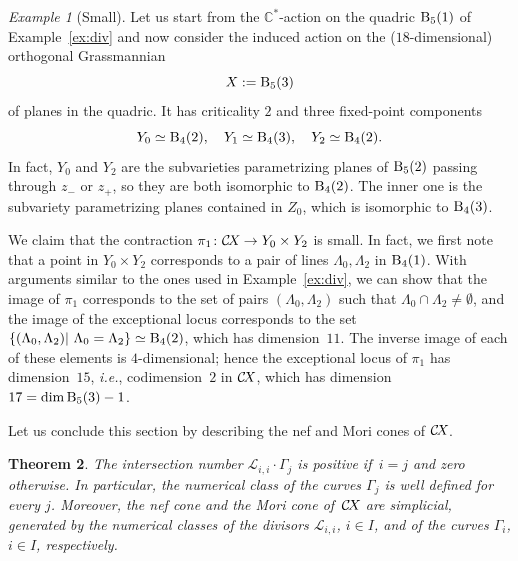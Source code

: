 \documentclass[10pt,a4paper]{article}
\numberwithin{equation}{section}
\newtheorem{theorem}{Theorem}[section]
\theoremstyle{definition}
\theoremstyle{remark}
\newtheorem{example}[theorem]{Example}
\def\C{{\mathbb C}}
\def\cL{{\mathcal L}}
\def\DB{{\rm B}}
\def\CX{\mathcal{C}\!X\hspace{-0.5pt}}
\begin{document}
\begin{example}[Small]\label{ex:sm}  Let us start from the $\C^*$-action on the quadric $\DB_5(1)$ of Example~\ref{ex:div} and now consider the induced action on the ($18$-dimensional) orthogonal Grassmannian \[X:=\DB_5(3)\] of planes in the quadric. It has criticality $2$ and three fixed-point components 
  \[
  Y_0\simeq\DB_4(2),\quad Y_1\simeq\DB_4(3),\quad Y_2\simeq\DB_4(2).
  \]
In fact, $Y_0$ and $Y_2$ are the subvarieties parametrizing planes of $\DB_5(2)$ passing through $z_-$ or $z_+$, so they are both isomorphic to $\DB_{4}(2)$. The inner one is the subvariety parametrizing planes contained in $Z_0$, which is isomorphic to $\DB_{4}(3)$.

We claim that the contraction $\pi_1\colon \CX\to Y_0\times Y_2$ is small. In fact, we first note that a point in $Y_0\times Y_2$ corresponds to a pair of lines $\Lambda_0,\Lambda_2$ in $\DB_4(1)$. With arguments similar to the ones used in Example~\ref{ex:div}, we can show that the image of $\pi_1$ corresponds to the set of pairs $(\Lambda_0,\Lambda_2)$ such that $\Lambda_0\cap \Lambda_2\neq \emptyset$, and the image of the exceptional locus corresponds to the set $\{(\Lambda_0,\Lambda_2)|\,\, \Lambda_0=\Lambda_2\}\simeq \DB_4(2)$, which has dimension~$11$. The inverse image of each of these elements is $4$-dimensional; hence the exceptional locus of $\pi_1$ has dimension~$15$, \textit{i.e.}, codimension~$2$ in $\CX$, which has dimension $17 = \dim \DB_5(3)-1$.
\end{example}

Let us conclude this section by  describing the nef and  Mori cones of $\CX$. 


\begin{theorem}\label{thm:nefcone}
The intersection number $\cL_{i,i}\cdot\Gamma_j$ is positive if\, $i=j$ and zero otherwise. In particular, the numerical class of the curves $\Gamma_j$ is well defined for every $j$. Moreover, the nef cone and the Mori cone of\, $\CX$ are simplicial, generated by the numerical classes of the divisors $\cL_{i,i}$, $i\in I$, and of the curves $\Gamma_i$, $i\in I$, respectively.
\end{theorem}
\end{document}
